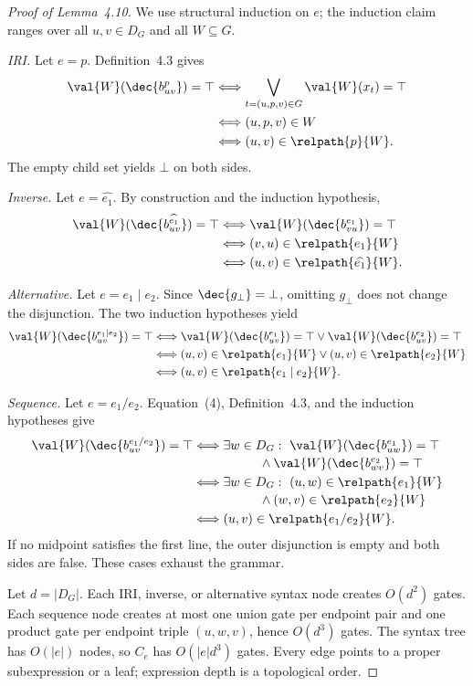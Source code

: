 \documentclass[sigconf, nonacm]{acmart}
\begin{document}
\begin{proof}[Proof of Lemma~4.10]
We use structural induction on $e$; the induction claim ranges over all $u,v\in D_G$ and all $W\subseteq G$.

\emph{IRI.} Let $e=p$. Definition~4.3 gives
\begin{align*}
 \val{W}(\dec{b^p_{uv}})=\top
 &\Longleftrightarrow
 \bigvee_{t=(u,p,v)\in G}\val{W}(x_t)=\top\\
 &\Longleftrightarrow (u,p,v)\in W\\
 &\Longleftrightarrow (u,v)\in\relpath{p}{W}.
\end{align*}
The empty child set yields $\bot$ on both sides.

\emph{Inverse.} Let $e=\widehat{e_1}$. By construction and the induction hypothesis,
\begin{align*}
 \val{W}(\dec{b^{\widehat{e_1}}_{uv}})=\top
 &\Longleftrightarrow \val{W}(\dec{b^{e_1}_{vu}})=\top\\
 &\Longleftrightarrow (v,u)\in\relpath{e_1}{W}\\
 &\Longleftrightarrow (u,v)\in\relpath{\widehat{e_1}}{W}.
\end{align*}

\emph{Alternative.} Let $e=e_1\mathbin{|}e_2$. Since $\dec{g_\bot}=\bot$, omitting $g_\bot$ does not change the disjunction. The two induction hypotheses yield
\begin{align*}
 \val{W}(\dec{b^{e_1\mid e_2}_{uv}})=\top
 &\Longleftrightarrow
 \val{W}(\dec{b^{e_1}_{uv}})=\top
 \lor \val{W}(\dec{b^{e_2}_{uv}})=\top\\
 &\Longleftrightarrow
 (u,v)\in\relpath{e_1}{W}\lor(u,v)\in\relpath{e_2}{W}\\
 &\Longleftrightarrow (u,v)\in\relpath{e_1\mid e_2}{W}.
\end{align*}

\emph{Sequence.} Let $e=e_1/e_2$. Equation~(4), Definition~4.3, and the induction hypotheses give
\begin{align*}
 \val{W}(\dec{b^{e_1/e_2}_{uv}})=\top
 &\Longleftrightarrow \exists w\in D_G:\
 \val{W}(\dec{b^{e_1}_{uw}})=\top\\[-1pt]
 &\hspace{52pt}\land\val{W}(\dec{b^{e_2}_{wv}})=\top\\
 &\Longleftrightarrow \exists w\in D_G:\
 (u,w)\in\relpath{e_1}{W}\\[-1pt]
 &\hspace{52pt}\land(w,v)\in\relpath{e_2}{W}\\
 &\Longleftrightarrow (u,v)\in\relpath{e_1/e_2}{W}.
\end{align*}
If no midpoint satisfies the first line, the outer disjunction is empty and both sides are false. These cases exhaust the grammar.

Let $d=|D_G|$. Each IRI, inverse, or alternative syntax node creates $O(d^2)$ gates. Each sequence node creates at most one union gate per endpoint pair and one product gate per endpoint triple $(u,w,v)$, hence $O(d^3)$ gates. The syntax tree has $O(|e|)$ nodes, so $C_e$ has $O(|e|d^3)$ gates. Every edge points to a proper subexpression or a leaf; expression depth is a topological order.
\end{proof}
\end{document}
